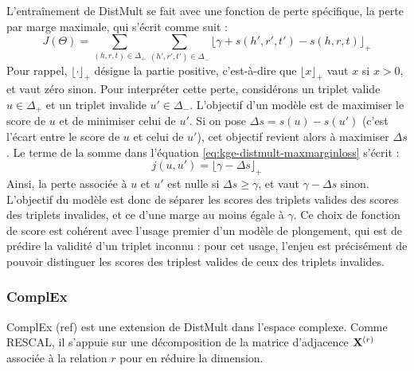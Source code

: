 

L'entraînement de DistMult se fait avec une fonction de perte spécifique, la perte par marge maximale, qui s'écrit comme suit :
\begin{equation}
    J(\Theta) = \sum_{(h, r, t) \in \Delta_+} \sum_{(h', r', t') \in \Delta_-} \lfloor \gamma + s(h', r', t') - s(h, r, t) \rfloor_+
    \label{eq:kge-distmult-maxmarginloss}
\end{equation}
Pour rappel, $\lfloor \cdot \rfloor_+$ désigne la partie positive, c'est-à-dire que $\lfloor x \rfloor_+$ vaut $x$ si $x > 0$, et vaut zéro sinon. Pour interpréter cette perte, considérons un triplet valide $u \in \Delta_+$ et un triplet invalide $u' \in \Delta_-$. L'objectif d'un modèle est de maximiser le score de $u$ et de minimiser celui de $u'$. Si on pose $\Delta s = s(u) - s(u')$ (c'est l'écart entre le score de $u$ et celui de $u'$), cet objectif revient alors à maximiser $\Delta s$. Le terme de la somme dans l'équation \ref{eq:kge-distmult-maxmarginloss} s'écrit :
\begin{equation}
    j(u, u') = \lfloor \gamma - \Delta s \rfloor_+
\end{equation}
Ainsi, la perte associée à $u$ et $u'$ est nulle si $\Delta s \geq \gamma$, et vaut $\gamma - \Delta s$ sinon. L'objectif du modèle est donc de séparer les scores des triplets valides des scores des triplets invalides, et ce d'une marge au moins égale à $\gamma$. Ce choix de fonction de score est cohérent avec l'usage premier d'un modèle de plongement, qui est de prédire la validité d'un triplet inconnu : pour cet usage, l'enjeu est précisément de pouvoir distinguer les scores des triplest valides de ceux des triplets invalides.

\subsubsection{ComplEx}
\label{subsec:complex}

ComplEx (ref) est une extension de DistMult dans l'espace complexe. Comme RESCAL, il s'appuie sur une décomposition de la matrice d'adjacence $\bf{X}^{(r)}$ associée à la relation $r$ pour en réduire la dimension.

